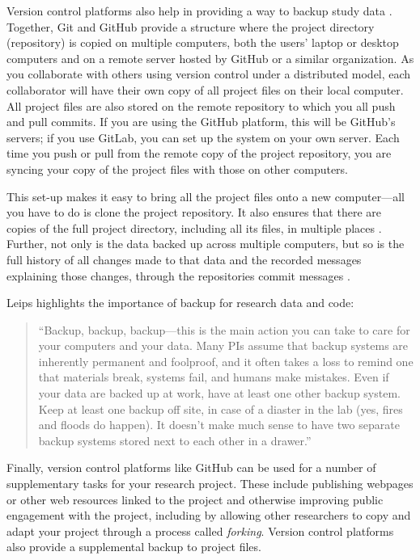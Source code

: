 \documentclass[]{tufte-book}
\begin{document}
Version control platforms also help in providing a way to backup study data
\citep{blischak2016quick, perez2016ten, perkel2018git}. Together, Git and GitHub
provide a structure where the project directory (repository) is copied on
multiple computers, both the users' laptop or desktop computers and on a remote
server hosted by GitHub or a similar organization. As you collaborate with
others using version control under a distributed model, each collaborator will
have their own copy of all project files on their local computer. All project
files are also stored on the remote repository to which you all push and pull
commits. If you are using the GitHub platform, this will be GitHub's servers; if
you use GitLab, you can set up the system on your own server. Each time you push
or pull from the remote copy of the project repository, you are syncing your
copy of the project files with those on other computers.

This set-up makes it easy to bring all the project files onto a new
computer---all you have to do is clone the project repository. It also ensures
that there are copies of the full project directory, including all its files, in
multiple places \citep{blischak2016quick}. Further, not only is the data backed up
across multiple computers, but so is the full history of all changes made to
that data and the recorded messages explaining those changes, through the
repositories commit messages \citep{perez2016ten}.

Leips highlights the importance of backup for research data and code:

\begin{quote}
``Backup, backup, backup---this is the main action you can take to care for your
computers and your data. Many PIs assume that backup systems are inherently
permanent and foolproof, and it often takes a loss to remind one that
materials break, systems fail, and humans make mistakes. Even if your data
are backed up at work, have at least one other backup system. Keep at least
one backup off site, in case of a diaster in the lab (yes, fires and floods
do happen). It doesn't make much sense to have two separate backup systems stored
next to each other in a drawer.'' \citep{leips2010helm}
\end{quote}

Finally, version control platforms like GitHub can be used for a number
of supplementary tasks for your research project. These include publishing
webpages or other web resources linked to the project and otherwise improving
public engagement with the project, including by allowing other researchers
to copy and adapt your project through a process called \emph{forking}. Version
control platforms also provide a supplemental backup to project files.
\end{document}
